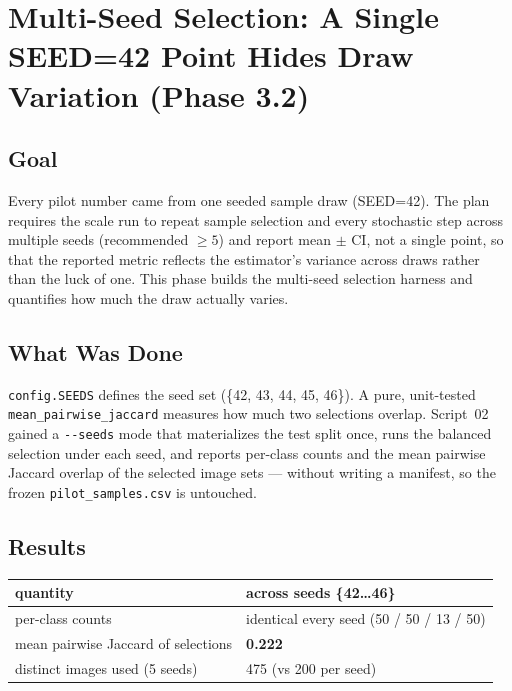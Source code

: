 \chapter{Multi-Seed Selection: A Single SEED=42 Point Hides Draw Variation (Phase 3.2)}
\label{chap:p3-2}

\section{Goal}

Every pilot number came from one seeded sample draw (SEED=42). The plan requires the scale run to repeat
sample selection and every stochastic step across multiple seeds (recommended $\geq 5$) and report mean
$\pm$ CI, not a single point, so that the reported metric reflects the estimator's variance across draws
rather than the luck of one. This phase builds the multi-seed selection harness and quantifies how much
the draw actually varies.

\section{What Was Done}

\texttt{config.SEEDS} defines the seed set (\{42, 43, 44, 45, 46\}). A pure, unit-tested
\texttt{mean\_pairwise\_jaccard} measures how much two selections overlap. Script~02 gained a
\texttt{-{}-seeds} mode that materializes the test split once, runs the balanced selection under each
seed, and reports per-class counts and the mean pairwise Jaccard overlap of the selected image sets ---
without writing a manifest, so the frozen \texttt{pilot\_samples.csv} is untouched.

\section{Results}

\begin{center}
\begin{tabular}{p{5.6cm}p{6.0cm}}
\toprule
\textbf{quantity} & \textbf{across seeds \{42\ldots46\}} \\
\midrule
per-class counts                       & identical every seed (50 / 50 / 13 / 50) \\
mean pairwise Jaccard of selections    & \textbf{0.222} \\
distinct images used (5 seeds)         & 475 (vs 200 per seed) \\
\bottomrule
\end{tabular}
\label{tab:p32-seeds}
\end{center}

